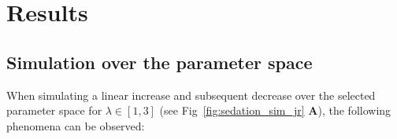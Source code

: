 \chapter{Results}\label{ch:results}






%

%
%
%
%
%

\section{Simulation over the parameter space}\label{sec:simulation-over-the-parameter-space}

When simulating a linear increase and subsequent decrease over the selected parameter space for
$ \lambda \in \left[ 1, 3 \right] $ (see Fig~\ref{fig:sedation_sim_jr} \textbf{A}),
the following phenomena can be observed:

